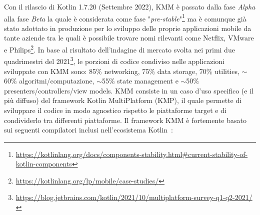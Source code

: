 Con il rilascio di Kotlin 1.7.20 (Settembre 2022), KMM è passato dalla fase \textit{Alpha} alla fase \textit{Beta} la quale è considerata come fase "\textit{pre-stable}"\footnote{\href{https://kotlinlang.org/docs/components-stability.html\#current-stability-of-kotlin-components}{https://kotlinlang.org/docs/components-stability.html\#current-stability-of-kotlin-components}} ma è comunque già stato adottato in produzione per lo sviluppo delle proprie applicazioni mobile da tante aziende tra le quali è possibile trovare nomi rilevanti come Netflix, VMware e Philips\footnote{\href{https://kotlinlang.org/lp/mobile/case-studies/}{https://kotlinlang.org/lp/mobile/case-studies/}}. In base al risultato dell'indagine di mercato svolta nei primi due quadrimestri del 2021\footnote{\href{https://blog.jetbrains.com/kotlin/2021/10/multiplatform-survey-q1-q2-2021/}{https://blog.jetbrains.com/kotlin/2021/10/multiplatform-survey-q1-q2-2021/}}, le porzioni di codice condiviso nelle applicazioni sviluppate con KMM sono: 85\% networking, 75\% data storage, 70\% utilities, $\sim$60\% algoritmi/computazione, $\sim$55\% state management e $\sim$50\% presenters/controllers/view models.
KMM consiste in un caso d'uso specifico (e il più diffuso) del framework Kotlin MultiPlatform (KMP), il quale permette di sviluppare il codice in modo agnostico rispetto le piattaforme target e di condividerlo tra differenti piattaforme. Il framework KMM è fortemente basato sui seguenti compilatori inclusi nell'ecosistema Kotlin~\cite{nagy2022simplifying}:

